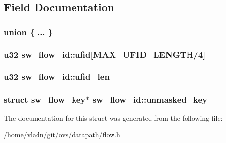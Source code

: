\subsection{Field Documentation}
\hypertarget{structsw__flow__id_a7a025ad1b692dac54dab18bb4170eaa0}{}\subsubsection[{"@31}]{\setlength{\rightskip}{0pt plus 5cm}union \{ ... \} }\label{structsw__flow__id_a7a025ad1b692dac54dab18bb4170eaa0}
\hypertarget{structsw__flow__id_a22ce2b1fed980149931fbccb05750f3e}{}
\subsubsection[{ufid}]{\setlength{\rightskip}{0pt plus 5cm}u32 sw\+\_\+flow\+\_\+id\+::ufid\mbox{[}{\bf M\+A\+X\+\_\+\+U\+F\+I\+D\+\_\+\+L\+E\+N\+G\+T\+H}/4\mbox{]}}\label{structsw__flow__id_a22ce2b1fed980149931fbccb05750f3e}
\hypertarget{structsw__flow__id_a7cfead96fedf295e55d6a17857adfbf5}{}
\subsubsection[{ufid\+\_\+len}]{\setlength{\rightskip}{0pt plus 5cm}u32 sw\+\_\+flow\+\_\+id\+::ufid\+\_\+len}\label{structsw__flow__id_a7cfead96fedf295e55d6a17857adfbf5}
\hypertarget{structsw__flow__id_a5d62dce79569cb8c25a43f4039e5df3c}{}
\subsubsection[{unmasked\+\_\+key}]{\setlength{\rightskip}{0pt plus 5cm}struct {\bf sw\+\_\+flow\+\_\+key}$\ast$ sw\+\_\+flow\+\_\+id\+::unmasked\+\_\+key}\label{structsw__flow__id_a5d62dce79569cb8c25a43f4039e5df3c}


The documentation for this struct was generated from the following file\+:\begin{DoxyCompactItemize}
\item 
/home/vladn/git/ovs/datapath/\hyperlink{flow_8h}{flow.\+h}\end{DoxyCompactItemize}
